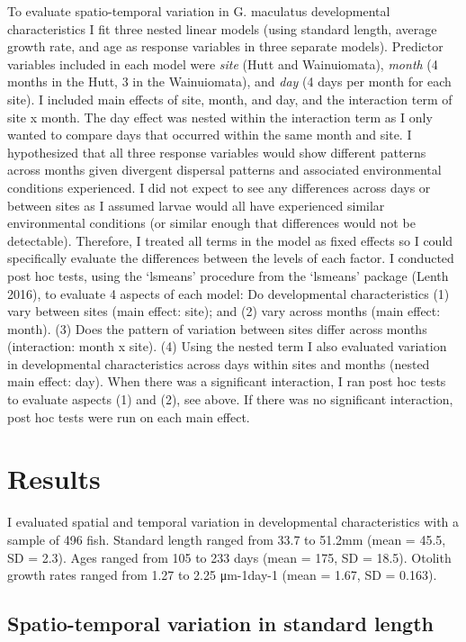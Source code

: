\documentclass[]{book}
\begin{document}
To evaluate spatio-temporal variation in G. maculatus developmental
characteristics I fit three nested linear models (using standard length,
average growth rate, and age as response variables in three separate
models). Predictor variables included in each model were \emph{site}
(Hutt and Wainuiomata), \emph{month} (4 months in the Hutt, 3 in the
Wainuiomata), and \emph{day} (4 days per month for each site). I
included main effects of site, month, and day, and the interaction term
of site x month. The day effect was nested within the interaction term
as I only wanted to compare days that occurred within the same month and
site. I hypothesized that all three response variables would show
different patterns across months given divergent dispersal patterns and
associated environmental conditions experienced. I did not expect to see
any differences across days or between sites as I assumed larvae would
all have experienced similar environmental conditions (or similar enough
that differences would not be detectable). Therefore, I treated all
terms in the model as fixed effects so I could specifically evaluate the
differences between the levels of each factor. I conducted post hoc
tests, using the `lsmeans' procedure from the `lsmeans' package (Lenth
2016), to evaluate 4 aspects of each model: Do developmental
characteristics (1) vary between sites (main effect: site); and (2) vary
across months (main effect: month). (3) Does the pattern of variation
between sites differ across months (interaction: month x site). (4)
Using the nested term I also evaluated variation in developmental
characteristics across days within sites and months (nested main effect:
day). When there was a significant interaction, I ran post hoc tests to
evaluate aspects (1) and (2), see above. If there was no significant
interaction, post hoc tests were run on each main effect.

\section{Results}\label{results}

I evaluated spatial and temporal variation in developmental
characteristics with a sample of 496 fish. Standard length ranged from
33.7 to 51.2mm (mean = 45.5, SD = 2.3). Ages ranged from 105 to 233 days
(mean = 175, SD = 18.5). Otolith growth rates ranged from 1.27 to 2.25
μm-1day-1 (mean = 1.67, SD = 0.163).

\subsection{Spatio-temporal variation in standard
length}\label{spatio-temporal-variation-in-standard-length}
\end{document}
